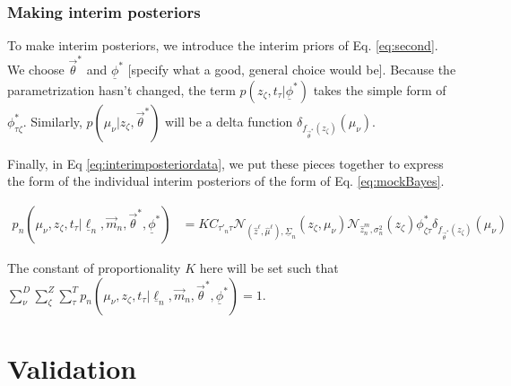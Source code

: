\documentclass[12pt, onecolumn]{emulateapj}
\newcommand{\textul}{\underline}
\begin{document}
\subsubsection{Making interim posteriors}
\label{sec:interimpriors}



To make interim posteriors, we introduce the interim priors of Eq. \ref{eq:second}.  We choose $\vec{\theta}^{*}$ and $\textul{\phi}^{*}$ [specify what a good, general choice would be].  Because the parametrization hasn't changed, the term $p(z_{\zeta}, t_{\tau} | \textul{\phi}^{*})$ takes the simple form of $\phi^{*}_{\tau\zeta}$.  Similarly, $p(\mu_{\nu} | z_{\zeta}, \vec{\theta}^{*})$ will be a delta function $\delta_{f_{\vec{\theta}^{*}}(z_{\zeta})}(\mu_{\nu})$.  

Finally, in Eq \ref{eq:interimposteriordata}, we put these pieces together to express the form of the individual interim posteriors of the form of Eq. \ref{eq:mockBayes}.

\begin{align}
\label{eq:interimposteriordata}
p_{n}(\mu_{\nu}, z_{\zeta}, t_{\tau} | \textul{\ell}_{n}, \vec{m}_{n}, \vec{\theta}^{*}, \textul{\phi}^{*}) &= KC_{\tau'_{n}\tau}\mathcal{N}_{(\hat{z}^{\ell}, \hat{\mu}^{\ell}), \textul{\Sigma}_{n}}(z_{\zeta}, \mu_{\nu}) \mathcal{N}_{\hat{z}_{n}^{m}, \sigma_{n}^{2}}(z_{\zeta}) \phi^{*}_{\zeta\tau}\delta_{f_{\vec{\theta}^{*}}(z_{\zeta})}(\mu_{\nu})
\end{align}

The constant of proportionality $K$ here will be set such that $\sum_{\nu}^{D}\sum_{\zeta}^{Z}\sum_{\tau}^{T} p_{n}(\mu_{\nu}, z_{\zeta}, t_{\tau} | \textul{\ell}_{n}, \vec{m}_{n}, \vec{\theta}^{*}, \textul{\phi}^{*})=1$.



\section{Validation}
\end{document}
